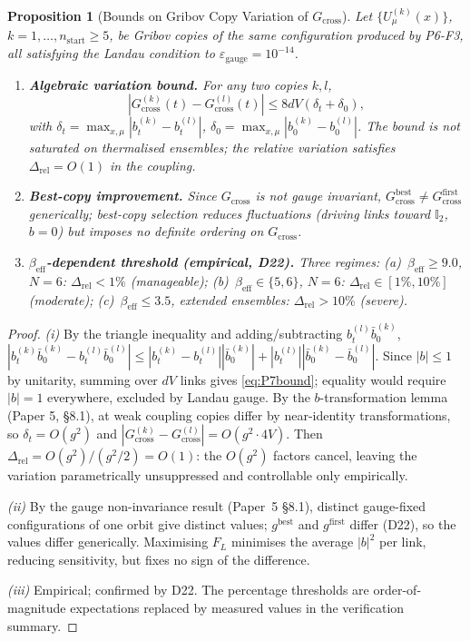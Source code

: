 \documentclass[11pt,a4paper]{article}
\theoremstyle{plain}
\newtheorem{proposition}{Proposition}
\theoremstyle{definition}
\theoremstyle{remark}
\newcommand{\Gcross}{G_{\mathrm{cross}}}
\newcommand{\be}{\beta_{\mathrm{eff}}}
\newcommand{\epsg}{\varepsilon_{\mathrm{gauge}}}
\newcommand{\FL}{F_{L}}
\newcommand{\Id}{\mathbb{I}}
\begin{document}
\setcounter{proposition}{6}
\begin{proposition}[Bounds on Gribov Copy Variation of $\Gcross$]
Let $\{U^{(k)}_\mu(x)\}$, $k=1,\ldots,n_{\mathrm{start}}\ge5$, be Gribov
copies of the same configuration produced by P6-F3, all satisfying the
Landau condition to $\epsg=10^{-14}$.
\begin{enumerate}[label=(\roman*)]
\item \textbf{Algebraic variation bound.} For any two copies $k,l$,
\begin{equation}
  |\Gcross^{(k)}(t)-\Gcross^{(l)}(t)|\le 8dV(\delta_t+\delta_0),
  \label{eq:P7bound}
\end{equation}
with $\delta_t=\max_{x,\mu}|b^{(k)}_t-b^{(l)}_t|$,
$\delta_0=\max_{x,\mu}|b^{(k)}_0-b^{(l)}_0|$. The bound is not saturated
on thermalised ensembles; the relative variation satisfies
$\Delta_{\mathrm{rel}}=O(1)$ in the coupling.
\item \textbf{Best-copy improvement.} Since $\Gcross$ is not gauge
invariant, $\Gcross^{\mathrm{best}}\ne\Gcross^{\mathrm{first}}$
generically; best-copy selection reduces fluctuations (driving links
toward $\Id_2$, $b=0$) but imposes no definite ordering on $\Gcross$.
\item \textbf{$\be$-dependent threshold (empirical, D22).} Three regimes:
(a)~$\be\ge9.0$, $N=6$: $\Delta_{\mathrm{rel}}<1\%$ (manageable);
(b)~$\be\in\{5,6\}$, $N=6$: $\Delta_{\mathrm{rel}}\in[1\%,10\%]$
(moderate); (c)~$\be\le3.5$, extended ensembles:
$\Delta_{\mathrm{rel}}>10\%$ (severe).
\end{enumerate}
\end{proposition}

\begin{proof}
\textit{(i)} By the triangle inequality and adding/subtracting
$b^{(l)}_t\bar b^{(k)}_0$,
$|b^{(k)}_t\bar b^{(k)}_0-b^{(l)}_t\bar b^{(l)}_0|\le
|b^{(k)}_t-b^{(l)}_t||\bar b^{(k)}_0|+|b^{(l)}_t||\bar b^{(k)}_0-\bar
b^{(l)}_0|$. Since $|b|\le1$ by unitarity, summing over $dV$ links gives
\eqref{eq:P7bound}; equality would require $|b|=1$ everywhere, excluded
by Landau gauge. By the $b$-transformation lemma (Paper 5, \S8.1), at weak coupling copies differ by
near-identity transformations, so $\delta_t=O(g^2)$ and
$|\Gcross^{(k)}-\Gcross^{(l)}|=O(g^2\cdot4V)$. Then
$\Delta_{\mathrm{rel}}=O(g^2)/(g^2/2)=O(1)$: the $O(g^2)$ factors cancel,
leaving the variation parametrically unsuppressed and controllable only
empirically.

\textit{(ii)} By the gauge non-invariance result (Paper~5 \S8.1), distinct gauge-fixed
configurations of one orbit give distinct values; $g^{\mathrm{best}}$ and
$g^{\mathrm{first}}$ differ (D22), so the values differ generically.
Maximising $\FL$ minimises the average $|b|^2$ per link, reducing
sensitivity, but fixes no sign of the difference.

\textit{(iii)} Empirical; confirmed by D22. The percentage thresholds are
order-of-magnitude expectations replaced by measured values in the
verification summary.
\end{proof}
\end{document}
